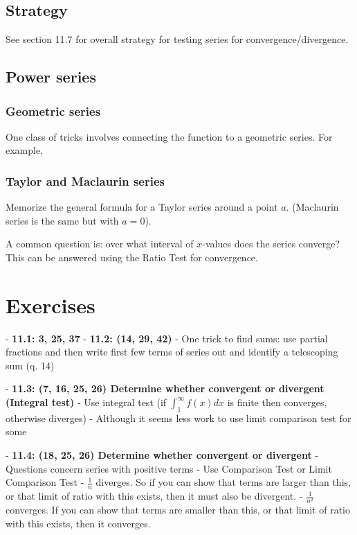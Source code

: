 \subsection{Strategy}

See section 11.7 for overall strategy for testing series for convergence/divergence.


\subsection{Power series}

\subsubsection{Geometric series}

One class of tricks involves connecting the function to a geometric series. For example,

\subsubsection{Taylor and Maclaurin series}

Memorize the general formula for a Taylor series around a point $a$. (Maclaurin series is the same but with $a=0$).

A common question is: over what interval of $x$-values does the series converge? This can be answered using the Ratio Test for convergence.



\section{Exercises}

- \textbf{11.1: 3, 25, 37}
- \textbf{11.2: (14, 29, 42)}
    - One trick to find sums: use partial fractions and then write first few terms of series out and identify a telescoping sum (q. 14)

- \textbf{11.3: (7, 16, 25, 26) Determine whether convergent or divergent (Integral test)}
    - Use integral test (if $\int_1^\infty f(x) dx$ is finite then converges, otherwise diverges)
    - Although it seems less work to use limit comparison test for some

- \textbf{11.4: (18, 25, 26) Determine whether convergent or divergent}
    - Questions concern series with positive terms
    - Use Comparison Test or Limit Comparison Test
    - $\frac{1}{n}$ diverges. So if you can show that terms are larger than this, or that limit of ratio with this exists, then it must also be divergent.
    - $\frac{1}{n^2}$ converges. If you can show that terms are smaller than this, or that limit of ratio with this exists, then it converges.

